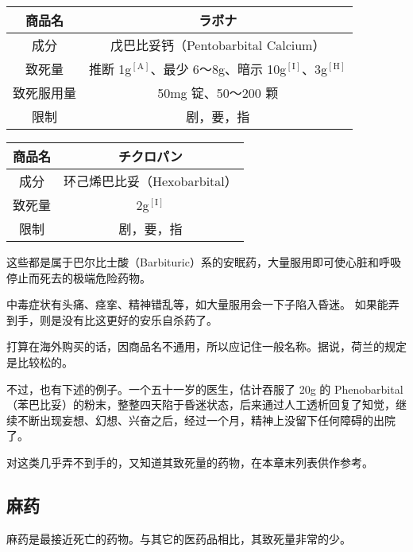 \documentclass[UTF8]{ctexart}
\begin{document}
\begin{table}[htbp]
\begin{center}
\begin{tabular}{cc}

\toprule
商品名 & ラボナ
 \\
\midrule
成分 & 戊巴比妥钙（Pentobarbital Calcium） \\
致死量 & 推断 1g$^\mathrm{[A]}$、最少 6～8g、暗示 10g$^\mathrm{[I]}$、3g$^\mathrm{[H]}$ \\
致死服用量 & 50mg 锭、50～200 颗 \\
限制& 剧，要，指 \\
\bottomrule
\end{tabular}
\end{center}
\end{table}


\begin{table}[htbp]
\begin{center}
\begin{tabular}{cc}

\toprule
商品名 & チクロパン
 \\
\midrule
成分 & 环己烯巴比妥（Hexobarbital） \\
致死量 & 2g$^\mathrm{[I]}$ \\
限制& 剧，要，指 \\
\bottomrule
\end{tabular}
\end{center}
\end{table}

这些都是属于巴尔比士酸（Barbituric）系的安眠药，大量服用即可使心脏和呼吸停止而死去的极端危险药物。

中毒症状有头痛、痉挛、精神错乱等，如大量服用会一下子陷入昏迷。 如果能弄到手，则是没有比这更好的安乐自杀药了。

打算在海外购买的话，因商品名不通用，所以应记住一般名称。据说，荷兰的规定是比较松的。

不过，也有下述的例子。一个五十一岁的医生，估计吞服了 20g 的 Phenobarbital（苯巴比妥）的粉末，整整四天陷于昏迷状态，后来通过人工透析回复了知觉，继续不断出现妄想、幻想、兴奋之后，经过一个月，精神上没留下任何障碍的出院了。

对这类几乎弄不到手的，又知道其致死量的药物，在本章末列表供作参考。

\subsection{麻药}

麻药是最接近死亡的药物。与其它的医药品相比，其致死量非常的少。
\end{document}
